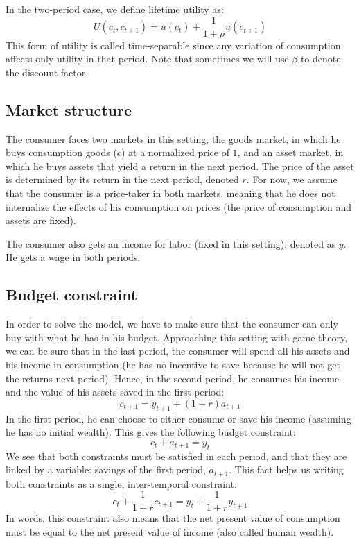 \documentclass[12pt]{report}
\begin{document}
In the two-period case, we define lifetime utility as: $$U(c_t, c_{t+1}) = u(c_t) + \frac{1}{1+\rho} u(c_{t+1}) $$ This form of utility is called time-separable since any variation of consumption affects only utility in that period. Note that sometimes we will use $\beta$ to denote the discount factor.

\subsection{Market structure}

The consumer faces two markets in this setting, the goods market, in which he buys consumption goods ($c$) at a normalized price of $1$, and an asset market, in which he buys assets that yield a return in the next period. The price of the asset is determined by its return in the next period, denoted $r$. For now, we assume that the consumer is a price-taker in both markets, meaning that he does not internalize the effects of his consumption on prices (the price of consumption and assets are fixed).

The consumer also gets an income for labor (fixed in this setting), denoted as $y$. He gets a wage in both periods.

\subsection{Budget constraint}

In order to solve the model, we have to make sure that the consumer can only buy with what he has in his budget. Approaching this setting with game theory, we can be sure that in the last period, the consumer will spend all his assets and his income in consumption (he has no incentive to save because he will not get the returns next period). Hence, in the second period, he consumes his income and the value of his assets saved in the first period: $$c_{t+1} = y_{t+1} + (1+r)a_{t+1} $$ In the first period, he can choose to either consume or save his income (assuming he has no initial wealth). This gives the following budget constraint: $$c_t + a_{t+1} = y_t $$
We see that both constraints must be satisfied in each period, and that they are linked by a variable: savings of the first period, $a_{t+1}$. This fact helps us writing both constraints as a single, inter-temporal constraint: $$c_t + \frac{1}{1+r}c_{t+1} = y_t + \frac{1}{1+r}y_{t+1} $$ In words, this constraint also means that the net present value of consumption must be equal to the net present value of income (also called human wealth).
\end{document}
